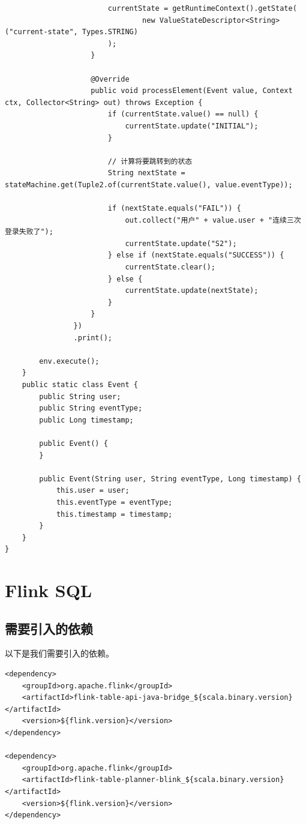 \documentclass[cn,11pt,chinese]{elegantbook}
\begin{document}
\begin{verbatim}
                        currentState = getRuntimeContext().getState(
                                new ValueStateDescriptor<String>("current-state", Types.STRING)
                        );
                    }

                    @Override
                    public void processElement(Event value, Context ctx, Collector<String> out) throws Exception {
                        if (currentState.value() == null) {
                            currentState.update("INITIAL");
                        }

                        // 计算将要跳转到的状态
                        String nextState = stateMachine.get(Tuple2.of(currentState.value(), value.eventType));

                        if (nextState.equals("FAIL")) {
                            out.collect("用户" + value.user + "连续三次登录失败了");
                            currentState.update("S2");
                        } else if (nextState.equals("SUCCESS")) {
                            currentState.clear();
                        } else {
                            currentState.update(nextState);
                        }
                    }
                })
                .print();
        
        env.execute();
    }
    public static class Event {
        public String user;
        public String eventType;
        public Long timestamp;

        public Event() {
        }

        public Event(String user, String eventType, Long timestamp) {
            this.user = user;
            this.eventType = eventType;
            this.timestamp = timestamp;
        }
    }
}
\end{verbatim}

\chapter{Flink SQL}

\section{需要引入的依赖}

以下是我们需要引入的依赖。

\begin{verbatim}
<dependency>
    <groupId>org.apache.flink</groupId>
    <artifactId>flink-table-api-java-bridge_${scala.binary.version}</artifactId>
    <version>${flink.version}</version>
</dependency>

<dependency>
    <groupId>org.apache.flink</groupId>
    <artifactId>flink-table-planner-blink_${scala.binary.version}</artifactId>
    <version>${flink.version}</version>
</dependency>
\end{verbatim}
\end{document}
